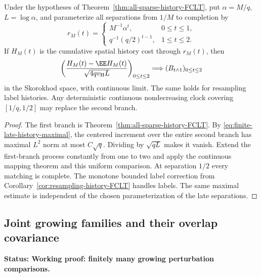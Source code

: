 \documentclass[11pt,letterpaper]{article}
\newcommand{\status}[1]{\textbf{Status: #1.}}
\begin{document}
\begin{corollary}
\label{cor:full-history-two-clock}
Under the hypotheses of Theorem~\ref{thm:all-sparse-history-FCLT},
put $\alpha=M/q$, $L=\log\alpha$, and parameterize all
separations from $1/M$ to completion by
\[
 r_M(t)=
 \begin{cases}
  M^{-1}\alpha^t,&0\le t\le1,\\
  q^{-1}(q/2)^{t-1},&1\le t\le2.
 \end{cases}
\]
If $H_M(t)$ is the cumulative spatial history cost through
$r_M(t)$, then
\begin{equation}\label{eq:full-history-two-clock}
 \left(\frac{H_M(t)-\EE H_M(t)}
                     {\sqrt{4qv_{\rm H}L}}\right)_{0\le t\le2}
       \Longrightarrow (B_{t\wedge1})_{0\le t\le2}
\end{equation}
in the Skorokhod space, with continuous limit.
The same holds for resampling label histories.
Any deterministic continuous nondecreasing clock covering
$[1/q,1/2]$ may replace the second branch.
\end{corollary}
\begin{proof}
The first branch is Theorem~\ref{thm:all-sparse-history-FCLT}.
By \eqref{eq:finite-late-history-maximal}, the centered
increment over the entire second branch has maximal $L^2$
norm at most $C\sqrt q$. Dividing by $\sqrt{qL}$ makes it
vanish. Extend the first-branch process constantly from one
to two and apply the continuous mapping theorem and this
uniform comparison. At separation $1/2$ every matching is
complete. The monotone bounded label correction from
Corollary~\ref{cor:resampling-history-FCLT} handles labels.
The same maximal estimate is independent of the chosen
parameterization of the late separations.
\end{proof}

\subsection{Joint growing families and their overlap covariance}
\label{sec:joint-growing-history}

\status{Working proof: finitely many growing perturbation comparisons}
\end{document}
